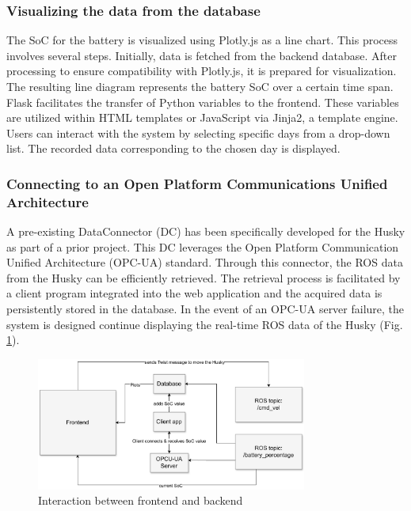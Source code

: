 \documentclass[conference]{IEEEtran}
\begin{document}
\subsubsection{Visualizing the data from the database}
The SoC for the battery is visualized using Plotly.js as a line chart. This process involves several steps. Initially, data is fetched from the backend database. After processing to ensure compatibility with Plotly.js, it is prepared for visualization. The resulting line diagram represents the battery SoC over a certain time span. Flask facilitates the transfer of Python variables to the frontend. 
These variables are utilized within HTML templates or JavaScript via Jinja2, a template engine. Users can interact with the system by selecting specific days from a drop-down list. The recorded data corresponding to the chosen day is displayed.
\subsubsection{Connecting to an Open Platform Communications Unified Architecture}
A pre-existing DataConnector (DC) has been specifically developed for the Husky as part of a prior project. This DC leverages the Open Platform Communication Unified Architecture (OPC-UA) standard. Through this connector, the ROS data from the Husky can be efficiently retrieved. The retrieval process is facilitated by a client program integrated into the web application and the acquired data is persistently stored in the database. 
In the event of an OPC-UA server failure, the system is designed continue displaying the real-time ROS data of the Husky (Fig. \ref{fig:backfront}).
\begin{figure}[htbp]
    \centerline{\includegraphics[width=8.9cm]{Pictures/backfront.pdf}}
    \caption{Interaction between frontend and backend}
    \label{fig:backfront}
\end{figure}
\end{document}
